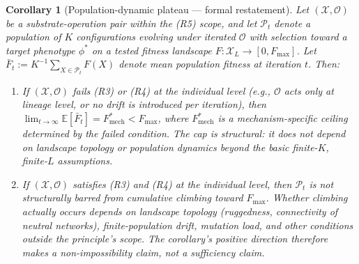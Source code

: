 \documentclass[11pt]{article}
\theoremstyle{plain}
\newtheorem{corollary}[theorem]{Corollary}
\theoremstyle{definition}
\newcommand{\Xset}{\mathcal{X}}
\newcommand{\Op}{\mathcal{O}}
\begin{document}
\begin{corollary}[Population-dynamic plateau --- formal restatement]
\label{cor:plateau_formal}
Let $(\Xset, \Op)$ be a substrate-operation pair within the (R5) scope, and let $\mathcal{P}_t$ denote a population of $K$ configurations evolving under iterated $\Op$ with selection toward a target phenotype $\phi^*$ on a tested fitness landscape $F: \Xset_L \to [0, F_{\max}]$. Let $\bar{F}_t := K^{-1} \sum_{X \in \mathcal{P}_t} F(X)$ denote mean population fitness at iteration $t$. Then:

\begin{enumerate}
  \item If $(\Xset, \Op)$ fails (R3) or (R4) at the individual level (e.g., $\Op$ acts only at lineage level, or no drift is introduced per iteration), then $\lim_{t \to \infty} \mathbb{E}[\bar{F}_t] = F^*_{\mathrm{mech}} < F_{\max}$, where $F^*_{\mathrm{mech}}$ is a mechanism-specific ceiling determined by the failed condition. The cap is structural: it does not depend on landscape topology or population dynamics beyond the basic finite-$K$, finite-$L$ assumptions.

  \item If $(\Xset, \Op)$ satisfies (R3) and (R4) at the individual level, then $\mathcal{P}_t$ is not structurally barred from cumulative climbing toward $F_{\max}$. Whether climbing actually occurs depends on landscape topology (ruggedness, connectivity of neutral networks), finite-population drift, mutation load, and other conditions outside the principle's scope. The corollary's positive direction therefore makes a non-impossibility claim, not a sufficiency claim.
\end{enumerate}
\end{corollary}
\end{document}
